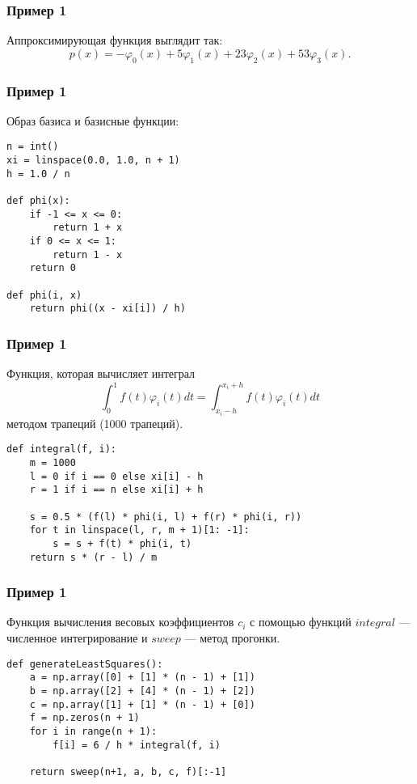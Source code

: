 \documentclass[10pt]{beamer}
\begin{document}
\begin{frame}[fragile]
\frametitle{Пример 1}
Аппроксимирующая функция выглядит так:
$$
p(x) = -\varphi_0(x) + 5 \varphi_1(x) + 23 \varphi_2(x) + 53 \varphi_3(x).
$$

\begin{center}
\end{center}

\end{frame}

\begin{frame}[fragile]
\frametitle{Пример 1}

Образ базиса и базисные функции:
\begin{lstlisting}
n = int()
xi = linspace(0.0, 1.0, n + 1)
h = 1.0 / n

def phi(x):
    if -1 <= x <= 0:
        return 1 + x
    if 0 <= x <= 1:
        return 1 - x
    return 0

def phi(i, x)
    return phi((x - xi[i]) / h)
\end{lstlisting}
\end{frame}

\begin{frame}[fragile]
\frametitle{Пример 1}
Функция, которая вычисляет интеграл
$$\int_{0}^{1} f(t) \varphi_i(t) dt= \int_{x_i-h}^{x_i+h} f(t) \varphi_i(t) dt$$
методом трапеций (1000 трапеций).
\begin{lstlisting}
def integral(f, i):
    m = 1000
    l = 0 if i == 0 else xi[i] - h
    r = 1 if i == n else xi[i] + h

    s = 0.5 * (f(l) * phi(i, l) + f(r) * phi(i, r))
    for t in linspace(l, r, m + 1)[1: -1]:
        s = s + f(t) * phi(i, t)
    return s * (r - l) / m
\end{lstlisting}
\end{frame}

\begin{frame}[fragile]
\frametitle{Пример 1}
Функция вычисления весовых коэффициентов $c_i$ с помощью функций $integral$ --- численное интегрирование и $sweep$ --- метод прогонки.
\begin{lstlisting}
def generateLeastSquares():
    a = np.array([0] + [1] * (n - 1) + [1])
    b = np.array([2] + [4] * (n - 1) + [2])
    c = np.array([1] + [1] * (n - 1) + [0])
    f = np.zeros(n + 1)
    for i in range(n + 1):
        f[i] = 6 / h * integral(f, i)
    
    return sweep(n+1, a, b, c, f)[:-1]
\end{lstlisting}

\end{frame}
\end{document}
